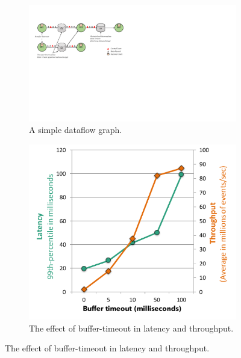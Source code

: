 \documentclass[11pt]{article}
\begin{document}
\begin{figure}[t!]
\begin{minipage}{1.1\linewidth}
      \centering
       \hspace{-0.1\linewidth}
      \begin{minipage}{0.55\linewidth}
        \begin{figure}[H]
        \centering
        \includegraphics[width=.999\textwidth]{figs/dataflow}
        \vspace{-5mm}
        \caption{A simple dataflow graph.}
        \label{fig:dataflow}
        \end{figure}
      \end{minipage}
      \hspace{0.03\linewidth}
      \begin{minipage}{0.32\linewidth}
          \begin{figure}[H]
				\includegraphics[width=.99\textwidth]{figs/latency-throughput.pdf}
				\vspace{-7mm}
    			\caption{The effect of buffer-timeout in latency and throughput.}
    			\label{fig:latency-throughput}
          \end{figure}
      \end{minipage}
  \end{minipage}
  \vspace{-4mm}
\end{figure}
\end{document}
